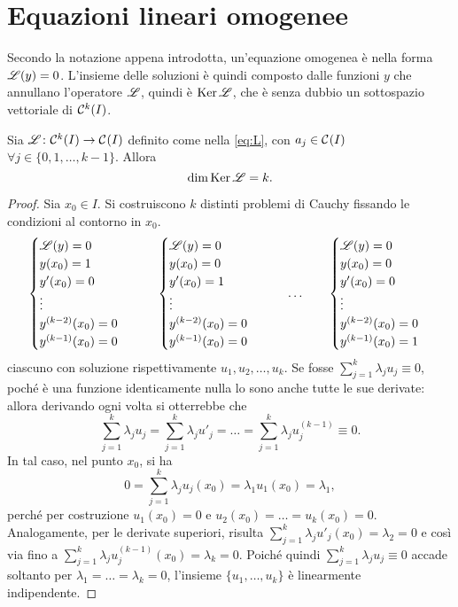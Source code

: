 \section{Equazioni lineari omogenee}
Secondo la notazione appena introdotta, un'equazione omogenea è nella forma $\mathscr L(y)=0$. L'insieme delle soluzioni è quindi composto dalle funzioni $y$ che annullano l'operatore $\mathscr L$, quindi è $\operatorname{Ker}\mathscr L$, che è senza dubbio un sottospazio vettoriale di $\mathcal{C}^{{k}}(I)$.
\begin{teorema} \label{t:k-soluzioni}
Sia $\mathscr L\colon\mathcal{C}^{{k}}(I)\to\mathcal{C}^{{}}(I)$ definito come nella \eqref{eq:L}, con $a_j\in\mathcal{C}^{{}}(I)$ $\forall j\in\{0,1,\dots,k-1\}$. Allora
\[
\dim\operatorname{Ker}\mathscr L=k.
\]
\end{teorema}
\begin{proof}
Sia $x_0\in I$. Si costruiscono $k$ distinti problemi di Cauchy fissando le condizioni al contorno in $x_0$.
\[
\begin{cases}
\mathscr L(y)=0\\y(x_0)=1\\y'(x_0)=0\\\vdots\\y^{(k-2)}(x_0)=0\\y^{(k-1)}(x_0)=0
\end{cases}\qquad
\begin{cases}
\mathscr L(y)=0\\y(x_0)=0\\y'(x_0)=1\\\vdots\\y^{(k-2)}(x_0)=0\\y^{(k-1)}(x_0)=0
\end{cases}\qquad\dots\qquad
\begin{cases}
\mathscr L(y)=0\\y(x_0)=0\\y'(x_0)=0\\\vdots\\y^{(k-2)}(x_0)=0\\y^{(k-1)}(x_0)=1
\end{cases}
\]
ciascuno con soluzione rispettivamente $u_1,u_2,\dots,u_k$.
Se fosse $\sum_{j=1}^k\lambda_ju_j\equiv 0$, poché è una funzione identicamente nulla lo sono anche tutte le sue derivate: allora derivando ogni volta si otterrebbe che
\[
\sum_{j=1}^k\lambda_ju_j=\sum_{j=1}^k\lambda_ju'_j=\dots=\sum_{j=1}^k\lambda_ju^{(k-1)}_j\equiv 0.
\]
In tal caso, nel punto $x_0$, si ha
\[
0=\sum_{j=1}^k\lambda_ju_j(x_0)=\lambda_1u_1(x_0)=\lambda_1,
\]
perché per costruzione $u_1(x_0)=0$ e $u_2(x_0)=\dots=u_k(x_0)=0$. Analogamente, per le derivate superiori, risulta $\sum_{j=1}^k\lambda_ju'_j(x_0)=\lambda_2=0$ e così via fino a $\sum_{j=1}^k\lambda_ju^{(k-1)}_j(x_0)=\lambda_k=0$. Poiché quindi $\sum_{j=1}^k\lambda_ju_j\equiv 0$ accade soltanto per $\lambda_1=\dots=\lambda_k=0$, l'insieme $\{u_1,\dots,u_k\}$ è linearmente indipendente.


\end{proof}
